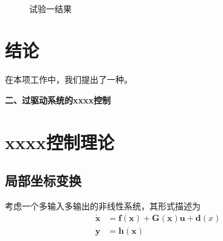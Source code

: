 \begin{ubox}
\begin{figure}[H]
{		\label{Fig:8:b}}\quad
	\setcounter{subfigure}{4}
	\\
	\setcounter{subfigure}{2}
	\quad
	\setcounter{subfigure}{5}
	\caption{\label{Fig:8}试验一结果}
\end{figure}


\section{结论}
在本项工作中，我们提出了一种。


\textbf{\fangsong\xiaosihao 二、过驱动系统的xxxx控制}
\setcounter{section}{0}
\setcounter{subsection}{0}
\section{xxxx控制理论}

\subsection{局部坐标变换}
考虑一个多输入多输出的非线性系统，其形式描述为
\begin{equation}
  \begin{aligned}
    \dot{\bm{x}}&=\bm{f}(\bm{x})+\bm{G}(\bm{x})\bm{u} + \bm{d}(x)\\
    \bm{y}&=\bm{h}(\bm{x})
  \end{aligned}
  \label{system}
\end{equation}


\end{ubox}
